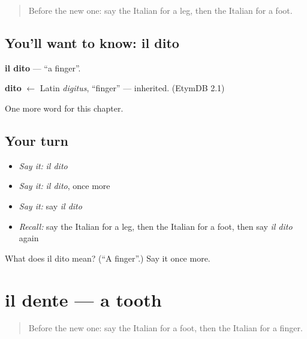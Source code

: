\label{lesson:IT-C37-dito}



\begin{quote}
Before the new one: say the Italian for a leg, then the Italian for a foot.
\end{quote}

\subsection*{You'll want to know: il dito}
\textbf{il dito} — \textquotedblleft{}a finger\textquotedblright{}.

\begin{cousinweb}
\textbf{dito} $\leftarrow$ Latin \emph{digitus}, \textquotedblleft{}finger\textquotedblright{} — inherited. (EtymDB 2.1)
\end{cousinweb}

\begin{grammarlens}[title={What you've built}]
One more word for this chapter.
\end{grammarlens}

\subsection*{Your turn}
\begin{itemize}
\raggedright
  \item \emph{Say it:} \emph{il dito}
  \item \emph{Say it:} \emph{il dito}, once more
  \item \emph{Say it:} say \emph{il dito}
  \item \emph{Recall:} say the Italian for a leg, then the Italian for a foot, then say \emph{il dito} again
\end{itemize}

\begin{tcolorbox}[breakable,colback=teal!4,colframe=teal!35!black,title={Before you move on}]
What does il dito mean? (\textquotedblleft{}A finger\textquotedblright{}.) Say it once more.
\end{tcolorbox}
\section[il dente]{il dente — a tooth}

\label{lesson:IT-C37-dente}



\begin{quote}
Before the new one: say the Italian for a foot, then the Italian for a finger.
\end{quote}

